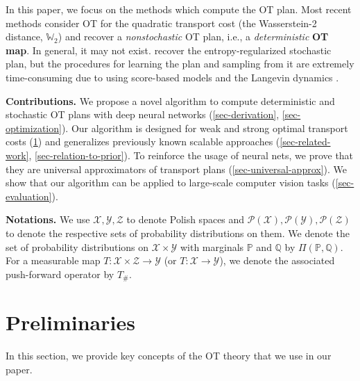 \documentclass{article} %
\begin{document}
\vspace{-1mm}In this paper, we focus on the methods which compute the OT plan. Most recent methods \citep{korotin2021neural,rout2022generative} consider OT for the quadratic transport cost (the Wasserstein-2 distance, $\mathbb{W}_{2}$) and recover a \textit{nonstochastic} OT plan, i.e., a \textit{deterministic} \textbf{OT map}. In general, it may not exist. \citep{daniels2021score} recover the entropy-regularized stochastic plan, but the procedures for learning the plan and sampling from it are extremely time-consuming due to using score-based models and the Langevin dynamics \citep[]{daniels2021score}.
 
\vspace{-1mm}\textbf{Contributions.} We propose a novel algorithm to compute deterministic and stochastic OT plans with deep neural networks (\wasyparagraph\ref{sec-derivation}, \wasyparagraph\ref{sec-optimization}). Our algorithm is designed for weak and strong optimal transport costs (\wasyparagraph\ref{sec-preliminaries}) and generalizes previously known scalable approaches (\wasyparagraph\ref{sec-related-work}, \wasyparagraph\ref{sec-relation-to-prior}). To reinforce the usage of neural nets, we prove that they are universal approximators of transport plans (\wasyparagraph\ref{sec-universal-approx}). We show that our algorithm can be applied to large-scale computer vision tasks (\wasyparagraph\ref{sec-evaluation}).

\textbf{Notations.} We use $\mathcal{X},\mathcal{Y},\mathcal{Z}$ to denote Polish spaces and $\mathcal{P}(\mathcal{X}), \mathcal{P}(\mathcal{Y}),\mathcal{P}(\mathcal{Z})$ to denote the respective sets of probability distributions on them. We denote the set of probability distributions on $\mathcal{X} \times \mathcal{Y}$ with marginals $\mathbb{P}$ and $\mathbb{Q}$ by $\Pi(\mathbb{P},\mathbb{Q})$.
For a measurable map $T:  \mathcal{X}\times\mathcal{Z}\rightarrow\mathcal{Y}$ (or $T:\mathcal{X}\rightarrow\mathcal{Y}$), we denote the associated push-forward operator by $T_{\#}$.

\vspace{-2.5mm}\section{Preliminaries}
\label{sec-preliminaries}

\vspace{-1mm}In this section, we provide key concepts of the OT theory \citep{villani2008optimal,santambrogio2015optimal,gozlan2017kantorovich,backhoff2019existence} that we use in our paper.
\end{document}
